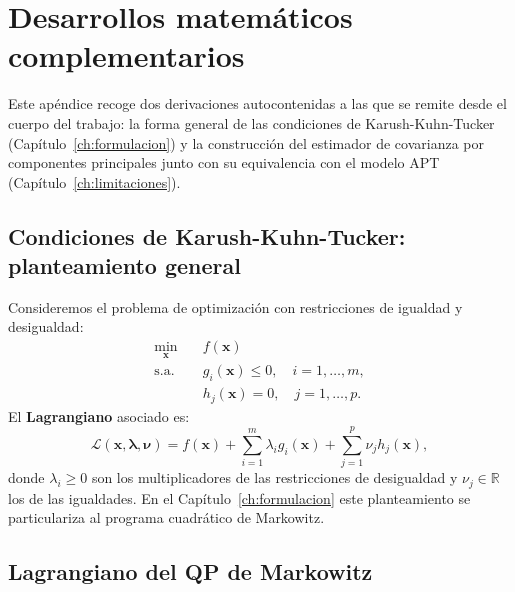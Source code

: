 \chapter{Desarrollos matemáticos complementarios}
\label{ap:desarrollos}

Este apéndice recoge dos derivaciones autocontenidas a las que se remite desde
el cuerpo del trabajo: la forma general de las condiciones de Karush-Kuhn-Tucker
(Capítulo~\ref{ch:formulacion}) y la construcción del estimador de covarianza
por componentes principales junto con su equivalencia con el modelo APT
(Capítulo~\ref{ch:limitaciones}).

\section{Condiciones de Karush-Kuhn-Tucker: planteamiento general}
\label{ap:kkt-general}

Consideremos el problema de optimización con restricciones de igualdad
y desigualdad:
\begin{equation}
    \begin{aligned}
        \min_{\mathbf{x}} \quad & f(\mathbf{x}) \\
        \text{s.a.} \quad & g_i(\mathbf{x}) \le 0, \quad i = 1, \dots, m, \\
        & h_j(\mathbf{x}) = 0, \quad j = 1, \dots, p.
    \end{aligned}
    \label{eq:problema-general}
\end{equation}
El \textbf{Lagrangiano} asociado es:
\begin{equation}
    \mathcal{L}(\mathbf{x}, \boldsymbol{\lambda}, \boldsymbol{\nu})
    = f(\mathbf{x})
    + \sum_{i=1}^{m} \lambda_i g_i(\mathbf{x})
    + \sum_{j=1}^{p} \nu_j h_j(\mathbf{x}),
    \label{eq:lagrangiano-general}
\end{equation}
donde $\lambda_i \ge 0$ son los multiplicadores de las restricciones de
desigualdad y $\nu_j \in \mathbb{R}$ los de las igualdades. En el
Capítulo~\ref{ch:formulacion} este planteamiento se particulariza al programa
cuadrático de Markowitz.

\section{Lagrangiano del QP de Markowitz}
\label{ap:kkt-markowitz}

